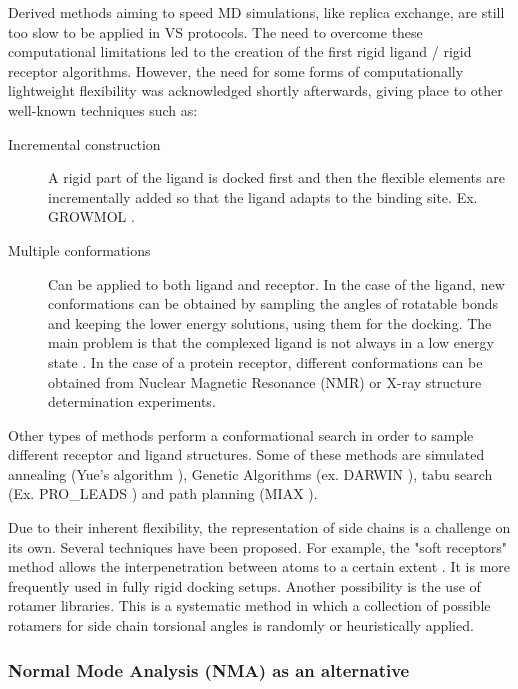 Derived methods aiming to speed MD simulations, like replica exchange, are still too slow to be applied in VS protocols. The need to overcome these computational limitations led to the creation of the first rigid ligand / rigid receptor algorithms. However, the need for some forms of computationally lightweight flexibility was acknowledged shortly afterwards, giving place to other well-known techniques such as:

\begin {description}
\item [Incremental construction] A rigid part of the ligand is docked first and then the flexible elements are incrementally added so that the ligand adapts to the binding site. Ex. GROWMOL \cite{bohacek_growmol_1999}.

\item [Multiple conformations] Can be applied to both ligand and receptor. In the case of the ligand, new conformations can be obtained by sampling the angles of rotatable bonds and keeping the lower energy solutions, using them for the docking. The main problem is that the complexed ligand is not always in a low energy state \cite{hurst_flexible_1994, nicklaus_conformational_1995}. In the case of a protein receptor, different conformations can be obtained from Nuclear Magnetic Resonance (NMR) or X-ray structure determination experiments. 
\end {description}

Other types of methods perform a conformational search in order to sample different receptor and ligand structures. Some of these methods are simulated annealing (Yue's algorithm \cite{yue_distance-constrained_1990}), Genetic Algorithms (ex. DARWIN \cite{taylor_darwin_2000}), tabu search (Ex. PRO\_LEADS \cite{baxter_flexible_1998}) and path planning (MIAX \cite{del_carpio-munoz_miax_2002}).

Due to their inherent flexibility, the representation of side chains is a challenge on its own. Several techniques have been proposed. For example, the "soft receptors" method allows the interpenetration between atoms to a certain extent \cite{jiang_soft_1991}. It is more frequently  used in fully rigid docking setups. Another possibility is the use of rotamer libraries. This is a systematic method in which a collection of possible rotamers for side chain torsional angles is randomly or heuristically applied.

\subsubsection{Normal Mode Analysis (NMA) as an alternative}

